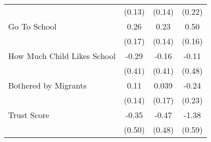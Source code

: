 {\begin{tabular}{l*{3}{c}}
            &      (0.13)         &      (0.14)         &      (0.22)         \\
\addlinespace
Go To School&        0.26         &        0.23         &        0.50\sym{**} \\
            &      (0.17)         &      (0.14)         &      (0.16)         \\
\addlinespace
How Much Child Likes School&       -0.29         &       -0.16         &       -0.11         \\
            &      (0.41)         &      (0.41)         &      (0.48)         \\
\addlinespace
Bothered by Migrants&        0.11         &       0.039         &       -0.24         \\
            &      (0.14)         &      (0.17)         &      (0.23)         \\
\addlinespace
Trust Score &       -0.35         &       -0.47         &       -1.38\sym{*}  \\
            &      (0.50)         &      (0.48)         &      (0.59)         \\
\bottomrule
\end{tabular}
}

